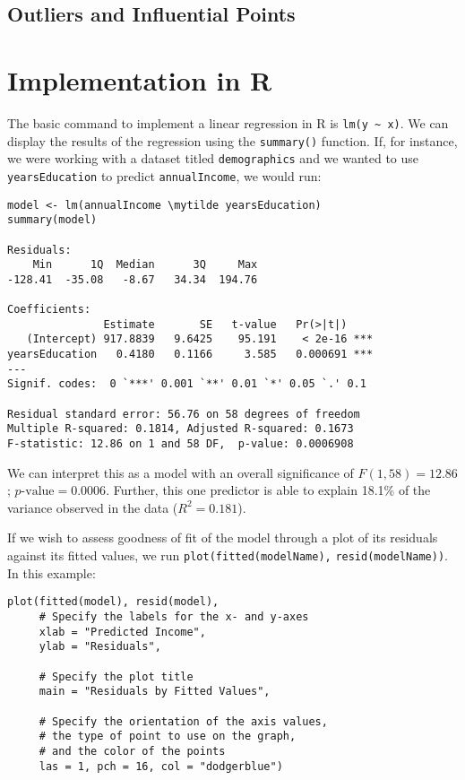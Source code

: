 \subsection{Outliers and Influential Points}



\section{Implementation in R}

The basic command to implement a linear regression in R is \verb|lm(y ~ x)|. We can display the results of the regression using the \verb|summary()| function. If, for instance, we were working with a dataset titled \verb|demographics| and we wanted to use \verb|yearsEducation| to predict \verb|annualIncome|, we would run:

\begin{framed}
\begin{Verbatim}[samepage=TRUE, commandchars=\\\{\}]
model <- lm(annualIncome \mytilde yearsEducation)
summary(model)

Residuals:
    Min      1Q  Median      3Q     Max 
-128.41  -35.08   -8.67   34.34  194.76 

Coefficients:
               Estimate       SE   t-value   Pr(>|t|)    
   (Intercept) 917.8839   9.6425    95.191    < 2e-16 ***
yearsEducation   0.4180   0.1166     3.585   0.000691 ***
---
Signif. codes:  0 `***' 0.001 `**' 0.01 `*' 0.05 `.' 0.1

Residual standard error: 56.76 on 58 degrees of freedom
Multiple R-squared: 0.1814, Adjusted R-squared: 0.1673 
F-statistic: 12.86 on 1 and 58 DF,  p-value: 0.0006908
\end{Verbatim}
\end{framed}

We can interpret this as a model with an overall significance of $F(1,58) = 12.86$; $p\text{-value}=0.0006$. Further, this one predictor is able to explain 18.1\% of the variance observed in the data ($R^2=0.181$).

If we wish to assess goodness of fit of the model through a plot of its residuals against its fitted values, we run \verb|plot(fitted(modelName),| \verb|resid(modelName))|. In this example:

\begin{framed}
\begin{Verbatim}[samepage=TRUE]
plot(fitted(model), resid(model),
     # Specify the labels for the x- and y-axes
     xlab = "Predicted Income",
     ylab = "Residuals",

     # Specify the plot title
     main = "Residuals by Fitted Values",

     # Specify the orientation of the axis values,
     # the type of point to use on the graph,
     # and the color of the points
     las = 1, pch = 16, col = "dodgerblue")
\end{Verbatim}
\end{framed}

